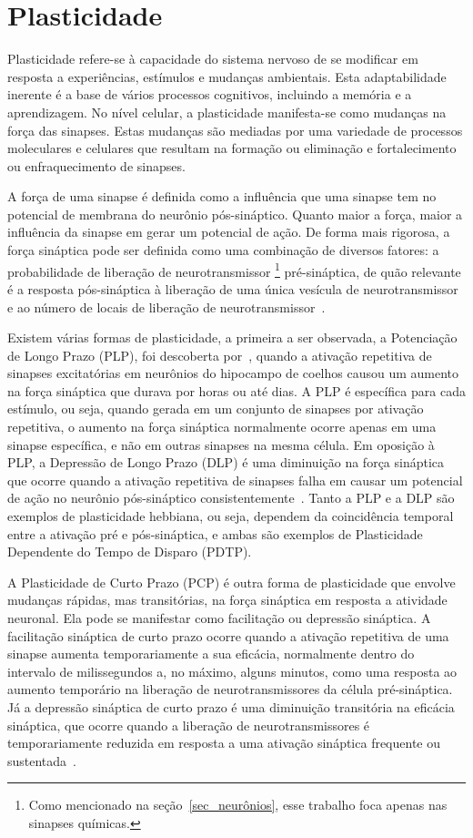 \section{Plasticidade}\label{section_plasticidade}

Plasticidade refere-se à capacidade do sistema nervoso de se modificar em resposta a experiências, estímulos e mudanças
ambientais. Esta adaptabilidade inerente é a base de vários processos cognitivos, incluindo a memória e a aprendizagem. No nível
celular, a plasticidade manifesta-se como mudanças na força das sinapses. Estas mudanças são mediadas por uma variedade de
processos moleculares e celulares que resultam na formação ou eliminação e fortalecimento ou enfraquecimento de sinapses.

A força de uma sinapse é definida como a influência que uma sinapse tem no potencial de membrana do neurônio pós-sináptico. Quanto
maior a força, maior a influência da sinapse em gerar um potencial de ação. De forma mais rigorosa, a força sináptica pode ser
definida como uma combinação de diversos fatores: a probabilidade de liberação de neurotransmissor
\footnote{Como mencionado na seção~\ref{sec_neurônios}, esse trabalho foca apenas nas sinapses químicas.}
pré-sináptica, de quão relevante é a resposta pós-sináptica à liberação de uma única vesícula de neurotransmissor e ao número de
locais de liberação de neurotransmissor~\cite{fattSpontaneous1952}. 

Existem várias formas de plasticidade, a primeira a ser observada, a Potenciação de Longo Prazo (PLP), foi descoberta
por~\cite{blissLonglasting1973}, quando a ativação repetitiva de sinapses excitatórias em neurônios do hipocampo de coelhos causou
um aumento na força sináptica que durava por horas ou até dias. A PLP é específica para cada estímulo, ou seja, quando gerada em
um conjunto de sinapses por ativação repetitiva, o aumento na força sináptica normalmente ocorre apenas em uma sinapse específica,
e não em outras sinapses na mesma célula. Em oposição à PLP, a Depressão de Longo Prazo (DLP) é uma diminuição na força
sináptica que ocorre quando a ativação repetitiva de sinapses falha em causar um potencial de ação no neurônio pós-sináptico
consistentemente~\cite{dudekHomosynaptic1992}. Tanto a PLP e a DLP são exemplos de plasticidade hebbiana, ou seja, dependem da
coincidência temporal entre a ativação pré e pós-sináptica, e ambas são exemplos de Plasticidade Dependente do Tempo de Disparo
(PDTP).

A Plasticidade de Curto Prazo (PCP) é outra forma de plasticidade que envolve mudanças rápidas, mas transitórias, na força
sináptica em resposta a atividade neuronal. Ela pode se manifestar como facilitação ou depressão sináptica. A facilitação
sináptica de curto prazo ocorre quando a ativação repetitiva de uma sinapse aumenta temporariamente a sua eficácia, normalmente
dentro do intervalo de milissegundos a, no máximo, alguns minutos, como uma resposta ao aumento temporário na liberação de
neurotransmissores da célula pré-sináptica. Já a depressão sináptica de curto prazo é uma diminuição transitória na eficácia
sináptica, que ocorre quando a liberação de neurotransmissores é temporariamente reduzida em resposta a uma ativação sináptica
frequente ou sustentada~\cite{zuckerShortTerm2002}.

